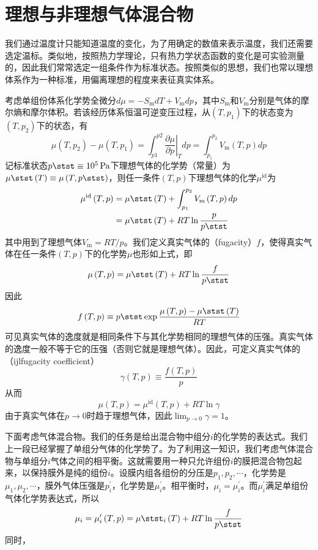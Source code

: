 \documentclass[main.tex]{subfiles}
\begin{document}
\section{理想与非理想气体混合物}
我们通过温度计只能知道温度的变化，为了用确定的数值来表示温度，我们还需要选定温标。类似地，按照热力学理论，只有热力学状态函数的变化是可实验测量的，因此我们常常选定一组条件作为标准状态。按照类似的思想，我们也常以理想体系作为一种标准，用偏离理想的程度来表征真实体系。

考虑单组份体系化学势全微分$d\mu=-S_\mathrm{m}dT+V_\mathrm{m}dp$，其中$S_\mathrm{m}$和$V_\mathrm{m}$分别是气体的摩尔熵和摩尔体积。若该经历体系恒温可逆变压过程，从$\left(T,p_1\right)$下的状态变为$\left(T,p_2\right)$下的状态，有
\[
\mu\left(T,p_2\right)-\mu\left(T,p_1\right)=\int_{p1}^{p2}\left.\frac{\partial\mu}{\partial p}\right|_Tdp=\int_{p_1}^{p_2}V_\mathrm{m}\left(T,p\right)dp\]
记标准状态$p\stst\equiv\qty{e5}{\pascal}$下理想气体的化学势（常量）为$\mu\stst\left(T\right)\equiv\mu\left(T,p\stst\right)$，则任一条件$\left(T,p\right)$下理想气体的化学$\mu^\mathrm{id}$为
\begin{align*}
\mu^\mathrm{id}\left(T,p\right)&=\mu\stst\left(T\right)+\int_{p_1}^{p_2}V_\mathrm{m}\left(T,p\right)dp\\
&=\mu\stst\left(T\right)+RT\ln\frac{p}{p\stst}
\end{align*}
其中用到了理想气体$V_\mathrm{m}=RT/p$。我们定义真实气体的（fugacity）$f$，使得真实气体在任一条件$\left(T,p\right)$下的化学势$\mu$也形如上式，即
\[\mu\left(T,p\right)=\mu\stst\left(T\right)+RT\ln\frac{f}{p\stst}\]
因此
\[f\left(T,p\right)\equiv p\stst\exp\frac{\mu\left(T,p\right)-\mu\stst\left(T\right)}{RT}\]
可见真实气体的逸度就是相同条件下与其化学势相同的理想气体的压强。真实气体的逸度一般不等于它的压强（否则它就是理想气体）。因此，可定义真实气体的（ijlfugacity coefficient）
\[\gamma\left(T,p\right)\equiv\frac{f\left(T,p\right)}{p}\]
从而
\[\mu\left(T,p\right)=\mu^\mathrm{id}\left(T,p\right)+RT\ln\gamma\]
由于真实气体在$p\rightarrow 0$时趋于理想气体，因此$\lim_{p\to 0}\gamma=1$。

下面考虑气体混合物。我们的任务是给出混合物中组分$i$的化学势的表达式。我们上一段已经掌握了单组分气体的化学势了。为了利用这一知识，我们考虑气体混合物与单组分$i$气体之间的相平衡。这就需要用一种只允许组份$i$的膜把混合物包起来，以保持膜外是纯的组份$i$。设膜内组各组份的分压是$p_1,p_2,\cdots$，化学势是$\mu_1,\mu_2,\cdots$，膜外气体压强是$p^\prime_i$，化学势是$\mu^\prime_i$。相平衡时，$\mu_i=\mu^\prime_i$。而$\mu^\prime_i$满足单组份气体化学势表达式，所以
\[\mu_i=\mu^\prime_i\left(T,p\right)=\mu\stst_i\left(T\right)+RT\ln\frac{f}{p\stst}\]
同时，
\end{document}
